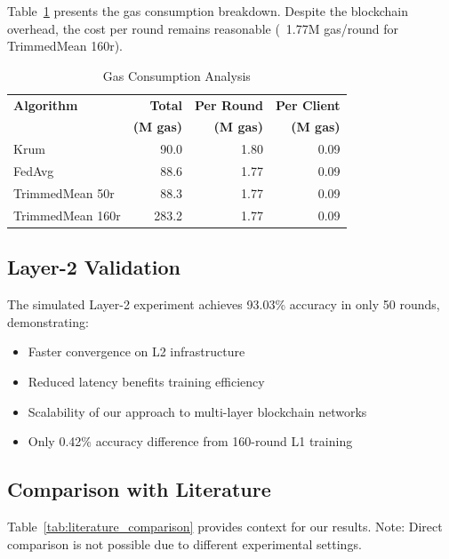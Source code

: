 \documentclass[12pt,a4paper,onecolumn]{article}
\begin{document}
Table~\ref{tab:gas_analysis} presents the gas consumption breakdown. Despite the blockchain overhead, the cost per round remains reasonable (~1.77M gas/round for TrimmedMean 160r).

\begin{table}[t]
\caption{Gas Consumption Analysis}
\label{tab:gas_analysis}
\centering
{\small
\begin{tabular}{lrrr}
\toprule
\textbf{Algorithm} & \textbf{Total} & \textbf{Per Round} & \textbf{Per Client} \\
& \textbf{(M gas)} & \textbf{(M gas)} & \textbf{(M gas)} \\
\midrule
Krum & 90.0 & 1.80 & 0.09 \\
FedAvg & 88.6 & 1.77 & 0.09 \\
TrimmedMean 50r & 88.3 & 1.77 & 0.09 \\
TrimmedMean 160r & 283.2 & 1.77 & 0.09 \\
\bottomrule
\end{tabular}
}
\end{table}

\subsection{Layer-2 Validation}

The simulated Layer-2 experiment achieves 93.03\% accuracy in only 50 rounds, demonstrating:
\begin{itemize}
    \item Faster convergence on L2 infrastructure
    \item Reduced latency benefits training efficiency
    \item Scalability of our approach to multi-layer blockchain networks
    \item Only 0.42\% accuracy difference from 160-round L1 training
\end{itemize}

\subsection{Comparison with Literature}

Table~\ref{tab:literature_comparison} provides context for our results. Note: Direct comparison is not possible due to different experimental settings.
\end{document}
